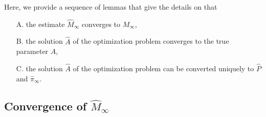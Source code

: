 \documentclass[journal]{IEEEtran}
\begin{document}
Here, we provide a sequence of lemmas that give the details on that 
\begin{enumerate}
    \item[A.] the estimate $\hat M_\infty$ converges to $M_\infty$,
    \item[B.] the solution $\hat A$ of the optimization problem
         converges to the true parameter $A$,
    \item[C.] the solution $\hat A$ of the optimization problem
         can be converted
        uniquely to $\hat P$ and $\hat \pi_\infty$.
\end{enumerate}

\subsection{Convergence of $\hat M_\infty$}
\end{document}
